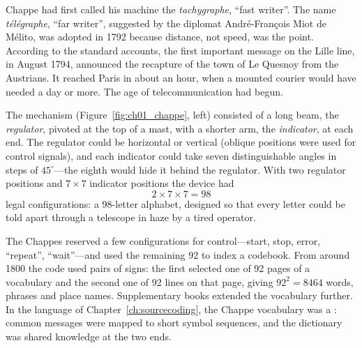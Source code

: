 
Chappe had first called his machine the \emph{tachygraphe}, ``fast writer''. The name
\emph{t\'el\'egraphe}, ``far writer'', suggested by the diplomat Andr\'e-Fran\c{c}ois Miot de
M\'elito, was adopted in 1792 because distance, not speed, was the point. According to the standard
accounts, the first important message on the Lille line, in August 1794, announced the recapture of
the town of Le Quesnoy from the Austrians. It reached Paris in about an hour, when a mounted courier
would have needed a day or more. The age of telecommunication had begun.

The mechanism (Figure~\ref{fig:ch01_chappe}, left) consisted of a long beam, the \emph{regulator},
pivoted at the top of a mast, with a shorter arm, the \emph{indicator}, at each end. The regulator
could be horizontal or vertical (oblique positions were used for control signals), and each
indicator could take seven distinguishable angles in steps of $45^\circ$---the eighth would hide it
behind the regulator. With two regulator positions and $7\times7$ indicator positions the device had
\begin{equation}
2\times7\times7 = 98
\end{equation}
legal configurations: a 98-letter alphabet, designed so that every letter could be told apart
through a telescope in haze by a tired operator.


The Chappes reserved a few configurations for control---start, stop, error, ``repeat'',
``wait''---and used the remaining 92 to index a codebook. From around 1800 the code used pairs of
signs: the first selected one of 92 pages of a vocabulary and the second one of 92 lines on that
page, giving $92^2=8464$ words, phrases and place names. Supplementary books extended the vocabulary
further. In the language of Chapter~\ref{ch:sourcecoding}, the Chappe vocabulary was a
: common messages were mapped to short symbol sequences, and the dictionary was
shared knowledge at the two ends.

